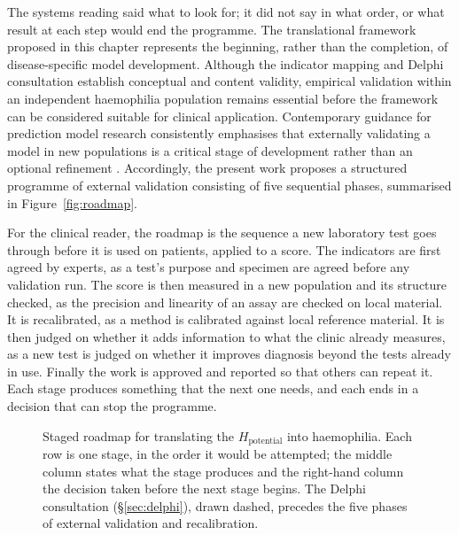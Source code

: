 \noindent The systems reading said what to look for; it did not say in what order, or what result at each step would end the programme. The translational framework proposed in this chapter represents the beginning, rather than the completion, of disease-specific model development. Although the indicator mapping and Delphi consultation establish conceptual and content validity, empirical validation within an independent haemophilia population remains essential before the framework can be considered suitable for clinical application. Contemporary guidance for prediction model research consistently emphasises that externally validating a model in new populations is a critical stage of development rather than an optional refinement \citep{moons_2019,collins_2024}. Accordingly, the present work proposes a structured programme of external validation consisting of five sequential phases, summarised in Figure~\ref{fig:roadmap}.

For the clinical reader, the roadmap is the sequence a new laboratory test goes through before it is used on patients, applied to a score. The indicators are first agreed by experts, as a test's purpose and specimen are agreed before any validation run. The score is then measured in a new population and its structure checked, as the precision and linearity of an assay are checked on local material. It is recalibrated, as a method is calibrated against local reference material. It is then judged on whether it adds information to what the clinic already measures, as a new test is judged on whether it improves diagnosis beyond the tests already in use. Finally the work is approved and reported so that others can repeat it. Each stage produces something that the next one needs, and each ends in a decision that can stop the programme.

\begin{figure}[htbp]
\centering

\captionsetup{justification=justified, width=\linewidth}
\caption{Staged roadmap for translating the $H_{\text{potential}}$ into haemophilia. Each row is one stage, in the order it would be attempted; the middle column states what the stage produces and the right-hand column the decision taken before the next stage begins. The Delphi consultation (\S\ref{sec:delphi}), drawn dashed, precedes the five phases of external validation and recalibration.}
\label{fig:roadmap}
\label{fig:hemo-roadmap}
\end{figure}

